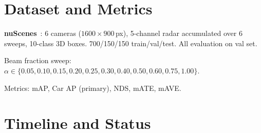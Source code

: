 \documentclass[12pt, a4paper]{article}
\theoremstyle{definition}
\begin{document}
\section{Dataset and Metrics}
\label{sec:dataset}

\textbf{nuScenes}~\cite{caesar2020nuscenes}: 6 cameras ($1600\times900$\,px),
5-channel radar accumulated over 6 sweeps, 10-class 3D boxes.
700/150/150 train/val/test. All evaluation on val set.

Beam fraction sweep:
$\alpha\in\{0.05, 0.10, 0.15, 0.20, 0.25, 0.30, 0.40, 0.50, 0.60, 0.75, 1.00\}$.

Metrics: mAP, Car AP (primary), NDS, mATE, mAVE.

\section{Timeline and Status}
\label{sec:timeline}
\end{document}
